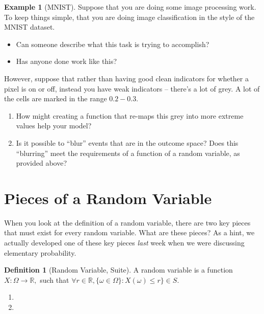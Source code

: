 \documentclass[
]{book}
\providecommand{\tightlist}{%
  \setlength{\itemsep}{0pt}\setlength{\parskip}{0pt}}
\theoremstyle{definition}
\newtheorem{definition}{Definition}[chapter]
\theoremstyle{definition}
\newtheorem{example}{Example}[chapter]
\theoremstyle{definition}
\theoremstyle{definition}
\theoremstyle{remark}
\begin{document}
\begin{example}[MNIST]

Suppose that you are doing some image processing work. To keep things simple, that you are doing image classification in the style of the MNIST dataset.

\begin{itemize}
\tightlist
\item
  Can someone describe what this task is trying to accomplish?
\item
  Has anyone done work like this?
\end{itemize}

However, suppose that rather than having good clean indicators for whether a pixel is on or off, instead you have weak indicators -- there's a lot of grey. A lot of the cells are marked in the range \(0.2 - 0.3\).

\begin{enumerate}
\def\labelenumi{\arabic{enumi}.}
\tightlist
\item
  How might creating a function that re-maps this grey into more extreme values help your model?
\item
  Is it possible to ``blur'' events that are in the outcome space? Does this ``blurring'' meet the requirements of a function of a random variable, as provided above?
\end{enumerate}

\end{example}

\hypertarget{pieces-of-a-random-variable}{%
\section{Pieces of a Random Variable}\label{pieces-of-a-random-variable}}

When you look at the definition of a random variable, there are two key pieces that must exist for every random variable. What are these pieces? As a hint, we actually developed one of these key pieces \emph{last} week when we were discussing elementary probability.

\begin{definition}[Random Variable, Suite]
A random variable is a function \(X : \Omega \rightarrow \mathbb{R},\) such that \(\forall r \in \mathbb{R}, \{\omega \in \Omega\}: X(\omega) \leq r\} \in S\).
\end{definition}

\begin{enumerate}
\def\labelenumi{\arabic{enumi}.}
\tightlist
\item
\item
\end{enumerate}
\end{document}
